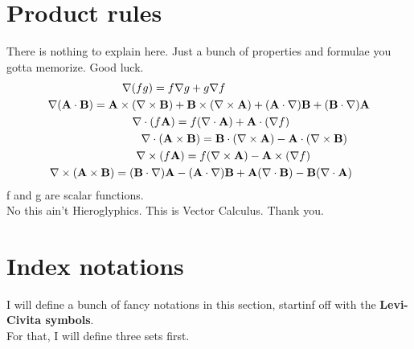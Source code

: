 \documentclass[12pt]{article}
\begin{document}
\section{Product rules}
There is nothing to explain here. Just a bunch of properties and formulae you gotta memorize. Good luck.
\begin{align}
    \nabla(fg)=f\nabla g + g \nabla f \hspace{4.5cm} \\
    \nabla (\mathbf{A} \cdot \mathbf{B})=\mathbf{A}\times(\nabla \times \mathbf{B})+\mathbf{B}\times(\nabla\times\mathbf{A})+(\mathbf{A}\cdot \nabla)\mathbf{B}+(\mathbf{B}\cdot\nabla)\mathbf{A} \\
    \nabla\cdot(f\mathbf{A})=f(\nabla\cdot\mathbf{A})+\mathbf{A}\cdot(\nabla f)\hspace{2.5cm} \\
    \nabla\cdot(\mathbf{A}\times\mathbf{B})=\mathbf{B}\cdot(\nabla \times \mathbf{A})-\mathbf{A}\cdot(\nabla \times \mathbf{B})\hspace{0.7cm}\\
    \nabla \times (f\mathbf{A})=f(\nabla \times \mathbf{A})-\mathbf{A}\times(\nabla f) \hspace{1.85cm}\\
    \nabla \times (\mathbf{A}\times\mathbf{B})=(\mathbf{B}\cdot \nabla)\mathbf{A} - (\mathbf{A}\cdot \nabla)\mathbf{B} + \mathbf{A}(\nabla\cdot\mathbf{B})-\mathbf{B}(\nabla\cdot\mathbf{A}) \hspace{0.55cm}
\end{align}
f and g are scalar functions. \\
No this ain't Hieroglyphics. This is Vector Calculus. Thank you.
\section{Index notations}
I will define a bunch of fancy notations in this section, startinf off with the \textbf{Levi-Civita symbols}.\\
For that, I will define three sets first. 
\end{document}
